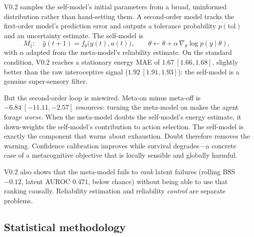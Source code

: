 \documentclass{article}
\begin{document}
V0.2 samples the self-model's initial parameters from a broad, uninformed distribution rather than hand-setting them. A second-order model tracks the first-order model's prediction error and outputs a tolerance probability $p(\mathrm{tol})$ and an uncertainty estimate. The self-model is
\begin{equation}
M_1:\quad \hat{y}(t+1) = f_\theta\bigl(y(t),a(t)\bigr),
\qquad
\theta \leftarrow \theta + \alpha\,\nabla_\theta \log p(y\mid\theta),
\end{equation}
with $\alpha$ adapted from the meta-model's reliability estimate. On the standard condition, V0.2 reaches a stationary energy MAE of $\mathbf{1.67\ [1.66,1.68]}$, slightly better than the raw interoceptive signal ($\mathbf{1.92\ [1.91,1.93]}$): the self-model is a genuine super-sensory filter.

But the second-order loop is miswired. Meta-on minus meta-off is $\mathbf{-6.84\ [-11.11,-2.57]}$ resources: turning the meta-model on makes the agent forage \emph{worse}. When the meta-model doubts the self-model's energy estimate, it down-weights the self-model's contribution to action selection. The self-model is exactly the component that warns about exhaustion. Doubt therefore removes the warning. Confidence calibration improves while survival degrades---a concrete case of a metacognitive objective that is locally sensible and globally harmful.

V0.2 also shows that the meta-model fails to \emph{rank} latent failures (rolling BSS $-0.12$, latent AUROC $0.471$, below chance) without being able to use that ranking causally. Reliability estimation and reliability \emph{control} are separate problems.

\subsection{Statistical methodology}
\end{document}
